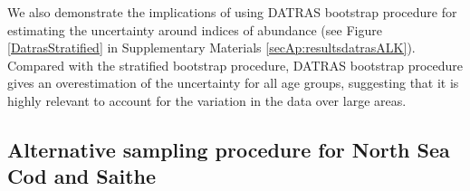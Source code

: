 \documentclass[a4paper 12pt]{article}
\numberwithin{equation}{section}
\begin{document}
{\begin{figure}[h!]
\end{figure}

We also demonstrate the implications of using DATRAS bootstrap procedure for estimating the uncertainty around indices of abundance (see Figure \ref{DatrasStratified} in Supplementary Materials \ref{secAp:resultsdatrasALK}). Compared with the stratified bootstrap procedure, DATRAS bootstrap procedure gives an overestimation of the uncertainty for all age groups, suggesting that it is highly relevant to account for the variation in the data over large areas. 


\subsection{Alternative sampling procedure for North Sea Cod and Saithe}
\label{sec:optimumeffortresults}

}
\end{document}
